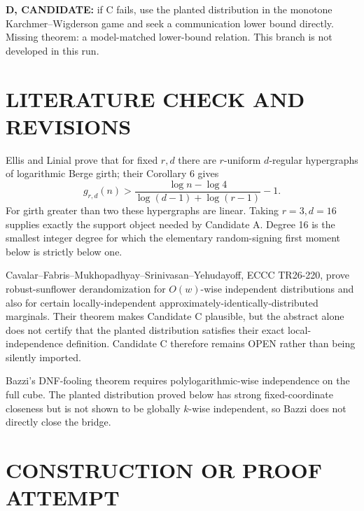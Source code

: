 \documentclass[11pt]{article}
\begin{document}
\textbf{D, CANDIDATE:} if C fails, use the planted distribution in the monotone Karchmer--Wigderson game and seek a communication lower bound directly. Missing theorem: a model-matched lower-bound relation. This branch is not developed in this run.

\section{LITERATURE CHECK AND REVISIONS}
Ellis and Linial prove that for fixed $r,d$ there are $r$-uniform $d$-regular hypergraphs of logarithmic Berge girth; their Corollary 6 gives
\[
g_{r,d}(n)>\frac{\log n-\log4}{\log(d-1)+\log(r-1)}-1.
\]
For girth greater than two these hypergraphs are linear. Taking $r=3,d=16$ supplies exactly the support object needed by Candidate A. Degree 16 is the smallest integer degree for which the elementary random-signing first moment below is strictly below one.

Cavalar--Fabris--Mukhopadhyay--Srinivasan--Yehudayoff, ECCC TR26-220, prove robust-sunflower derandomization for $O(w)$-wise independent distributions and also for certain locally-independent approximately-identically-distributed marginals. Their theorem makes Candidate C plausible, but the abstract alone does not certify that the planted distribution satisfies their exact local-independence definition. Candidate C therefore remains OPEN rather than being silently imported.

Bazzi's DNF-fooling theorem requires polylogarithmic-wise independence on the full cube. The planted distribution proved below has strong fixed-coordinate closeness but is not shown to be globally $k$-wise independent, so Bazzi does not directly close the bridge.

\section{CONSTRUCTION OR PROOF ATTEMPT}
\end{document}
